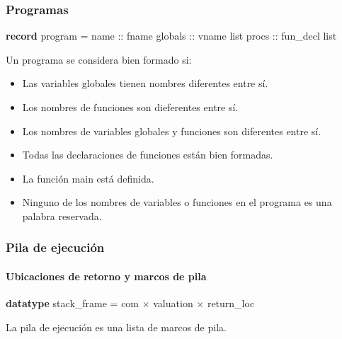\begin{frame}[fragile]
\frametitle{Programas}

\begin{semiverbatim}
\textbf{record} program =
  name :: fname
  globals :: vname list
  procs :: fun_decl list
\end{semiverbatim}
\pause

\begin{block}{Un programa se considera bien formado si:}
\begin{itemize}
\item{Las variables globales tienen nombres diferentes entre sí.}
\pause
\item{Los nombres de funciones son dieferentes entre sí.}
\pause
\item{Los nombres de variables globales y funciones son diferentes entre sí.}
\pause
\item{Todas las declaraciones de funciones están bien formadas.}
\pause
\item{La función main está definida.}
\pause
\item{Ninguno de los nombres de variables o funciones en el programa es una palabra reservada.}
\end{itemize}
\end{block}


\end{frame}


\begin{frame}[fragile]
\frametitle{Pila de ejecución}
\framesubtitle{Ubicaciones de retorno y marcos de pila}

\textbf{datatype} stack\_frame = com $\times$ valuation $\times$ return\_loc

\bigskip

La pila de ejecución es una lista de marcos de pila.



\bigskip

\end{frame}


